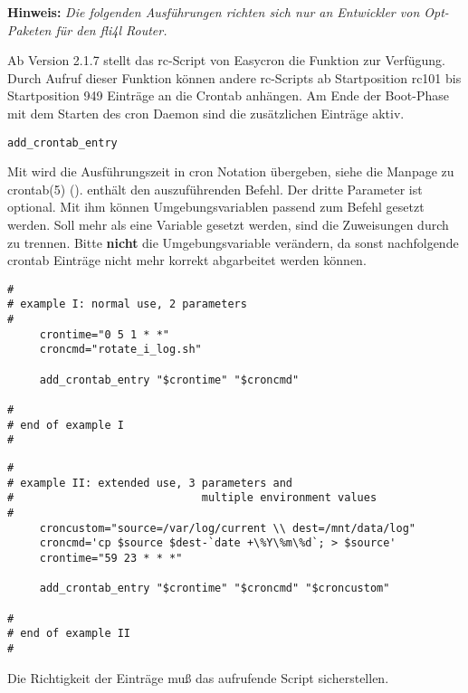 
\textbf{Hinweis:} \emph{Die folgenden Ausführungen richten sich nur an Entwickler
von Opt-Paketen für den fli4l Router.}

Ab Version 2.1.7 stellt das rc-Script von Easycron die Funktion 
 zur Verfügung. Durch Aufruf dieser Funktion können
andere rc-Scripts ab Startposition rc101 bis Startposition 949 Einträge an die
Crontab anhängen. Am Ende der Boot-Phase mit dem Starten des cron Daemon sind 
die zusätzlichen Einträge aktiv.

\texttt{add\_crontab\_entry} 

Mit  wird die Ausführungszeit in cron Notation übergeben, siehe die
Manpage zu crontab(5) ().
 enthält den auszuführenden Befehl.  Der dritte Parameter
 ist optional. Mit ihm können Umgebungsvariablen passend zum Befehl
gesetzt werden. Soll mehr als eine Variable gesetzt werden, sind die
Zuweisungen durch \var{$\backslash\backslash$} zu trennen. Bitte \textbf{nicht} die
Umgebungsvariable  verändern, da sonst nachfolgende crontab Einträge
nicht mehr korrekt abgarbeitet werden können.

\begin{verbatim}
#
# example I: normal use, 2 parameters
#
     crontime="0 5 1 * *"
     croncmd="rotate_i_log.sh"

     add_crontab_entry "$crontime" "$croncmd"

#
# end of example I
#
\end{verbatim}

\begin{verbatim}
#
# example II: extended use, 3 parameters and 
#                             multiple environment values 
#
     croncustom="source=/var/log/current \\ dest=/mnt/data/log"
     croncmd='cp $source $dest-`date +\%Y\%m\%d`; > $source'
     crontime="59 23 * * *"

     add_crontab_entry "$crontime" "$croncmd" "$croncustom"

#
# end of example II
#
\end{verbatim}

Die Richtigkeit der Einträge muß das aufrufende Script sicherstellen.

